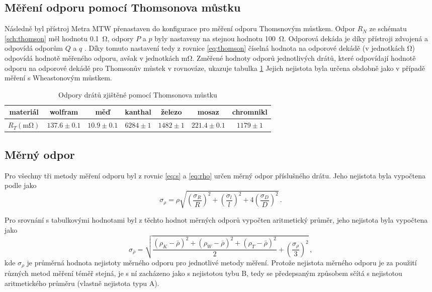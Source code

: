 \documentclass{../concepts/prepareprotokol} %
\newcommand{\relunc}[1]{
\left( \frac{\sigma_{#1}}{#1} \right)^2
}
\begin{document}
\subsection{Měření odporu pomocí Thomsonova můstku} \label{thomson}

Následně byl přístroj Metra MTW přenastaven do konfigurace pro měření odporu Thomsnovým můstkem. Odpor $R_N$ ze schématu \ref{sch:thomson} měl hodnotu \SI{0.1}{\ohm}, odpory $P$ a $p$ byly nastaveny na stejnou hodnotu \SI{100}{\ohm}. Odporová dekáda je díky přístroji zdvojená a odpovídá odporům $Q$ a $q$ \cite{pokyny}. Díky tomuto nastavení tedy z rovnice \ref{eq:thomson} číselná hodnota na odporové dekádě (v jednotkách \si{\ohm}) odpovídá hodnotě měřeného odporu, avšak v jednotkách \si{\milli\ohm}. Změřené hodnoty odporů jednotlivých drátů, které odpovídají hodnotě odporu na odporové dekádě pro Thomsonův můstek v rovnováze, ukazuje tabulka \ref{tab:thomson} Jejich nejistota byla určena obdobně jako v případě měření s Wheastonovým můstkem.

\begin{table}[!hbtp]
\centering
\caption{Odpory drátů zjištěné pomocí Thomsonova můstku}
\begin{tabular}{c|cccccc}
 \toprule
 materiál & wolfram & měď & kanthal & železo & mosaz & chromnikl \\
 \midrule
 $R_T (\si{\milli\ohm})$ & $137.6 \pm 0.1$ & $10.9 \pm 0.1$ & $6284 \pm 1$ & $1482 \pm 1$ & $221.4 \pm 0.1$ & $1179 \pm 1$ \\
 \bottomrule
\end{tabular}
\label{tab:thomson}
\end{table}

\subsection{Měrný odpor}

Pro všechny tři metody měření odporu byl z rovnic \ref{eq:s} a \ref{eq:rho} určen měrný odpor příslušného drátu. Jeho nejistota byla vypočtena podle \cite{englich} jako
\begin{equation}
    \sigma_\rho = \rho \sqrt{\relunc{R} + \relunc{l} + 4 \relunc{D}} \, .
\end{equation}

Pro srovnání s tabulkovými hodnotami byl z těchto hodnot měrných odporů vypočten aritmetický průměr, jeho nejistota byla vypočtena jako
\begin{equation}
    \sigma_{\bar{\rho}} = \sqrt{\frac{\left(\rho_K - \bar{\rho}\right)^2+ \left(\rho_W - \bar{\rho}\right)^2 + \left(\rho_T - \bar{\rho}\right)^2}{2} + \left(\frac{\sigma_{\rho}}{3}\right)^2} \, ,
\end{equation}
kde $\sigma_\rho$ je průměrná hodnota nejistoty měrného odporu pro jednotlivé metody měření. Protože nejistota měrného odporu je za použití různých metod měření téměř stejná, je s ní zacházeno jako s nejistotou tybu B, tedy se předepsaným způsobem \cite{englich} sčítá s nejistotou aritmetického průměru (vlastně nejistota typu A).
\end{document}
